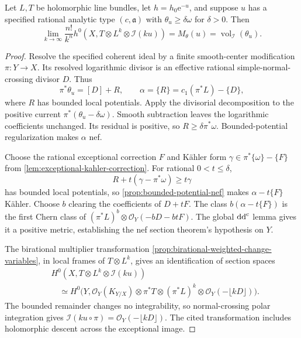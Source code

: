 \begin{proposition}\label{prop:strict-analytic-type-section-asymptotic}
Let $L,T$ be holomorphic line bundles, let $h=h_0\mathrm e^{-u}$, and suppose $u$ has a specified rational analytic type $(c,\mathfrak a)$ with $\theta_u\geq\delta\omega$ for $\delta>0$. Then
\begin{equation}\label{eq:strict-analytic-section-asymptotic}
 \lim_{k\to\infty}\frac{n!}{k^n}
       h^0(X,T\otimes L^k\otimes\mathcal I(ku))
       =M_\theta(u)=\operatorname{vol}_{\mathcal I}(\theta_u).
\end{equation}
\end{proposition}
\begin{proof}
Resolve the specified coherent ideal by a finite smooth-center modification $\pi:Y\to X$. Its resolved logarithmic divisor is an effective rational simple-normal-crossing divisor $D$. Thus
\[
 \pi^*\theta_u=[D]+R,
 \qquad \alpha=\{R\}=c_1(\pi^*L)-\{D\},
\]
where $R$ has bounded local potentials. Apply the divisorial decomposition to the positive current $\pi^*(\theta_u-\delta\omega)$. Smooth subtraction leaves the logarithmic coefficients unchanged. Its residual is positive, so $R\geq\delta\pi^*\omega$. Bounded-potential regularization makes $\alpha$ nef.

Choose the rational exceptional correction $F$ and K\"ahler form $\gamma\in\pi^*\{\omega\}-\{F\}$ from \cref{lem:exceptional-kahler-correction}. For rational $0<t\leq\delta$,
\[
 R+t(\gamma-\pi^*\omega)\geq t\gamma
\]
has bounded local potentials, so \cref{prop:bounded-potential-nef} makes $\alpha-t\{F\}$ K\"ahler. Choose $b$ clearing the coefficients of $D+tF$. The class $b(\alpha-t\{F\})$ is the first Chern class of
$(\pi^*L)^b\otimes\mathcal O_Y(-bD-btF)$.
The global $\mathrm{dd}^{\mathrm{c}}$ lemma gives it a positive metric, establishing the nef section theorem's hypothesis on $Y$.

The birational multiplier transformation \cref{prop:birational-weighted-change-variables}, in local frames of $T\otimes L^k$, gives an identification of section spaces
\[
 \begin{aligned}
 &H^0(X,T\otimes L^k\otimes\mathcal I(ku))\\
 &\quad\simeq H^0\bigl(Y,\mathcal O_Y(K_{Y/X})\otimes\pi^*T
            \otimes(\pi^*L)^k\otimes\mathcal O_Y(-\lfloor kD\rfloor)\bigr).
 \end{aligned}
\]
The bounded remainder changes no integrability, so normal-crossing polar integration gives $\mathcal I(ku\circ\pi)=\mathcal O_Y(-\lfloor kD\rfloor)$. The cited transformation includes holomorphic descent across the exceptional image.


\end{proof}
